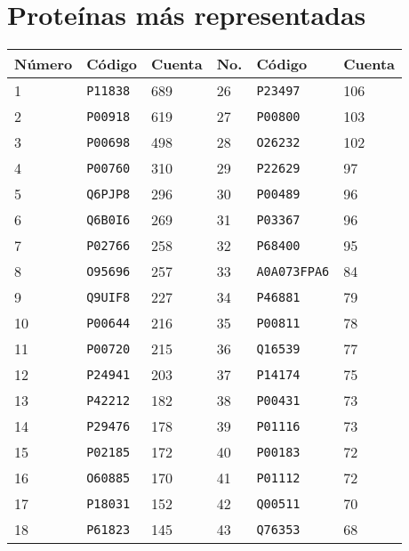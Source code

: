 \chapter{Proteínas más representadas}

\begin{table}[h]
	\centering
	\begin{tabular}{@{}llllll@{}}
	\toprule
	Número & Código    & Cuenta & No. & Código       & Cuenta \\* \midrule

1      & \texttt{P11838} & 689    & 26     & \texttt{P23497}     & 106  \\
2      & \texttt{P00918} & 619    & 27     & \texttt{P00800}     & 103  \\
3      & \texttt{P00698} & 498    & 28     & \texttt{O26232}     & 102  \\
4      & \texttt{P00760} & 310    & 29     & \texttt{P22629}     & 97   \\
5      & \texttt{Q6PJP8} & 296    & 30     & \texttt{P00489}     & 96   \\
6      & \texttt{Q6B0I6} & 269    & 31     & \texttt{P03367}     & 96   \\
7      & \texttt{P02766} & 258    & 32     & \texttt{P68400}     & 95   \\
8      & \texttt{O95696} & 257    & 33     & \texttt{A0A073FPA6} & 84   \\
9      & \texttt{Q9UIF8} & 227    & 34     & \texttt{P46881}     & 79   \\
10     & \texttt{P00644} & 216    & 35     & \texttt{P00811}     & 78   \\
11     & \texttt{P00720} & 215    & 36     & \texttt{Q16539}     & 77   \\
12     & \texttt{P24941} & 203    & 37     & \texttt{P14174}     & 75   \\
13     & \texttt{P42212} & 182    & 38     & \texttt{P00431}     & 73   \\
14     & \texttt{P29476} & 178    & 39     & \texttt{P01116}     & 73   \\
15     & \texttt{P02185} & 172    & 40     & \texttt{P00183}     & 72   \\
16     & \texttt{O60885} & 170    & 41     & \texttt{P01112}     & 72   \\
17     & \texttt{P18031} & 152    & 42     & \texttt{Q00511}     & 70   \\
18     & \texttt{P61823} & 145    & 43     & \texttt{Q76353}     & 68   \\

\end{tabular}
\end{table}
